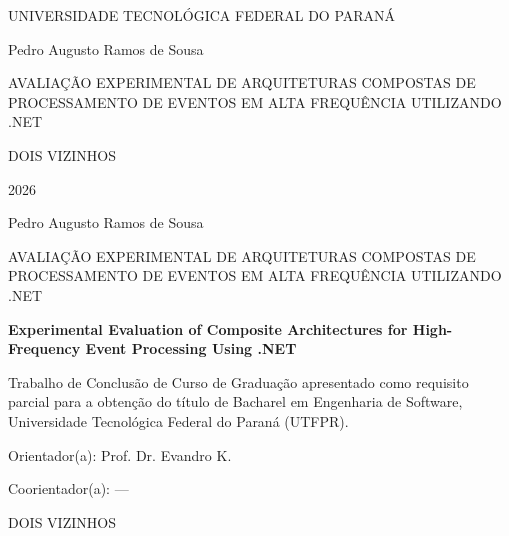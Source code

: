 \documentclass[12pt]{article}
\title{\titulo}
\author{Pedro Augusto Ramos de Sousa \\\\ \email{pedro.sousa@utfpr.edu.br}}
\newcommand{\autor}{Pedro Augusto Ramos de Sousa}
\newcommand{\titulo}{Avaliação Experimental de Arquiteturas Compostas de Processamento de Eventos em Alta Frequência Utilizando .NET}
\newcommand{\tituloUppercase}{\MakeUppercase{\titulo}}
\newcommand{\titulotraduzido}{Experimental Evaluation of Composite Architectures for High-Frequency Event Processing Using .NET}
\newcommand{\orientador}{Prof. Dr. Evandro K.}
\newcommand{\coorientador}{---}
\newcommand{\ano}{\the\year{}}
\begin{document}


\begin{titlepage}
\centering
{\large UNIVERSIDADE TECNOLÓGICA FEDERAL DO PARANÁ \par}
\vspace*{4cm}
{\large Pedro Augusto Ramos de Sousa \par}
\vspace{6cm}
{\large AVALIAÇÃO EXPERIMENTAL DE ARQUITETURAS COMPOSTAS DE PROCESSAMENTO DE EVENTOS EM ALTA FREQUÊNCIA UTILIZANDO .NET \par}
\vspace*{\fill}
{\large DOIS VIZINHOS \par}
{\large 2026 \par}
\end{titlepage}

\newpage
\pagestyle{empty}

\begin{titlepage}
\centering
{\large \autor \par}
\vspace{6cm}
{\large \tituloUppercase \par}
\vspace{1cm}
{\large \textbf{\titulotraduzido} \par}
\vspace{4cm}

\hfill
\parbox[t]{9cm}{
\RaggedRight
Trabalho de Conclusão de Curso de Graduação apresentado como requisito parcial para a
obtenção do título de Bacharel em Engenharia de Software, Universidade Tecnológica Federal
do Paraná (UTFPR). \par
\vspace{0.5cm}
Orientador(a): \orientador \par
\vspace{0.3cm}
Coorientador(a): \coorientador \par
}

\vspace*{\fill}
{\large DOIS VIZINHOS \par}
{\large \ano \par}

\licencaBySa
\vspace{-1.5cm}
\end{titlepage}

\newpage
\pagestyle{empty}
\end{document}
